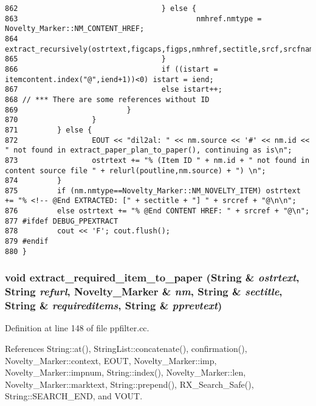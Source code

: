 \begin{verbatim}
862                                 } else {
863                                         nmhref.nmtype = Novelty_Marker::NM_CONTENT_HREF;
864                                         extract_recursively(ostrtext,figcaps,figps,nmhref,sectitle,srcf,srcfname,srcfnum,depth,visited,poutline,pprevtext);
865                                 }
866                                 if ((istart = itemcontent.index("@",iend+1))<0) istart = iend;
867                                 else istart++;
868 // *** There are some references without ID
869                         }
870                 }
871         } else {
872                 EOUT << "dil2al: " << nm.source << '#' << nm.id << " not found in extract_paper_plan_to_paper(), continuing as is\n";
873                 ostrtext += "% (Item ID " + nm.id + " not found in content source file " + relurl(poutline,nm.source) + ") \n";
874         }
875         if (nm.nmtype==Novelty_Marker::NM_NOVELTY_ITEM) ostrtext += "% <!-- @End EXTRACTED: [" + sectitle + "] " + srcref + "@\n\n";
876         else ostrtext += "% @End CONTENT HREF: " + srcref + "@\n";
877 #ifdef DEBUG_PPEXTRACT
878         cout << 'F'; cout.flush();
879 #endif
880 }
\end{verbatim}\normalsize 
{}
\subsubsection{\setlength{\rightskip}{0pt plus 5cm}void extract\_\-required\_\-item\_\-to\_\-paper ({\bf String} \& {\em ostrtext}, {\bf String} {\em refurl}, {\bf Novelty\_\-Marker} \& {\em nm}, {\bf String} \& {\em sectitle}, {\bf String} \& {\em requireditems}, {\bf String} \& {\em pprevtext})}\label{ppfilter_8cc_a3}




Definition at line 148 of file ppfilter.cc.

References String::at(), String\-List::concatenate(), confirmation(), Novelty\_\-Marker::context, EOUT, Novelty\_\-Marker::imp, Novelty\_\-Marker::impnum, String::index(), Novelty\_\-Marker::len, Novelty\_\-Marker::marktext, String::prepend(), RX\_\-Search\_\-Safe(), String::SEARCH\_\-END, and VOUT.



